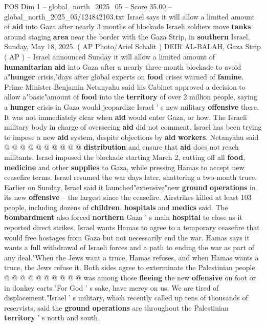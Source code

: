 \begin{textsample}{POS Dim 1 – global\_north\_2025\_05 – Score 35.00 – global\_north\_2025\_05/124842103.txt}  \label{ex:f1_pos_220}
Israel says it will allow a limited amount of \textbf{aid} into Gaza after nearly 3 months of blockade Israeli soldiers move \textbf{tanks} around staging \textbf{area} near the border with the Gaza Strip, in \textbf{southern} Israel, Sunday, May 18, 2025. ( AP Photo/Ariel Schalit ) DEIR AL-BALAH, Gaza Strip ( AP ) -- Israel announced Sunday it will allow a limited amount of \textbf{humanitarian} \textbf{aid} into Gaza after a nearly three-month blockade to avoid a"\textbf{hunger} crisis,"days after global experts on \textbf{food} crises warned of \textbf{famine}.
Prime Minister Benjamin Netanyahu said his Cabinet approved a decision to allow a"basic"amount of \textbf{food} into the \textbf{territory} of over 2 million people, saying a \textbf{hunger} crisis in Gaza would jeopardize Israel ' s new military \textbf{offensive} there.
It was not immediately clear when \textbf{aid} would enter Gaza, or how.
The Israeli military body in charge of overseeing \textbf{aid} did not comment.
Israel has been trying to impose a new \textbf{aid} system, despite objections by \textbf{aid} \textbf{workers}.
Netanyahu said @ @ @ @ @ @ @ @ @ @ \textbf{distribution} and ensure that \textbf{aid} does not reach militants.
Israel imposed the blockade starting March 2, cutting off all \textbf{food}, \textbf{medicine} and other \textbf{supplies} to Gaza, while pressing Hamas to accept new ceasefire terms.
Israel resumed the war days later, shattering a two-month truce.
Earlier on Sunday, Israel said it launched"extensive"new \textbf{ground} \textbf{operations} in its new \textbf{offensive} -- the largest since the ceasefire.
Airstrikes killed at least 103 people, including dozens of \textbf{children}, \textbf{hospitals} and \textbf{medics} said.
The \textbf{bombardment} also forced \textbf{northern} Gaza ' s main \textbf{hospital} to close as it reported direct strikes.
Israel wants Hamas to agree to a temporary ceasefire that would free hostages from Gaza but not necessarily end the war.
Hamas says it wants a full withdrawal of Israeli forces and a path to ending the war as part of any deal."When the Jews want a truce, Hamas refuses, and when Hamas wants a truce, the Jews refuse it.
Both sides agree to exterminate the Palestinian people @ @ @ @ @ @ @ @ @ @ was among those \textbf{fleeing} the new \textbf{offensive} on foot or in donkey carts."For God ' s sake, have mercy on us.
We are tired of displacement."Israel ' s military, which recently called up tens of thousands of reservists, said the \textbf{ground} \textbf{operations} are throughout the Palestinian \textbf{territory} ' s north and south.

\end{textsample}
